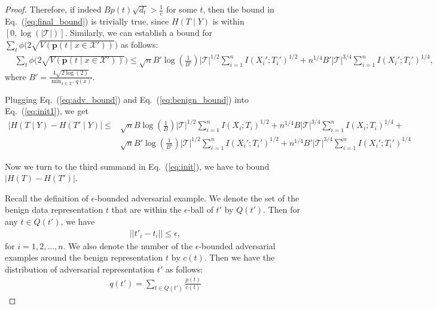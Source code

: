\documentclass{article} \usepackage{iclr2021_conference,times}
\theoremstyle{definition}
\theoremstyle{remark}
\begin{document}
\begin{proof}
Therefore, if indeed $Bp(t) \sqrt{d_t} > \frac{1}{e}$ for some $t$, then the bound in Eq.~(\ref{eq:final_bound}) is trivially true, since $H(T \mid Y)$ is within $[0, \log(|\mathcal{T}|)]$.
Similarly, we can establish a bound for $\sum_t \phi \big( 2\sqrt{V(\mathbf{p}(t \mid x \in \mathcal{X'}))} \big)$ as follows:
\begin{align} 
    \label{eq:adv_bound}
      &\sum_t \phi \big( 2\sqrt{V(\mathbf{p}(t \mid x \in \mathcal{X'}))} \big)
      \le \sqrt{n}B'\log(\frac{1}{B'}) |\mathcal{T}|^{1/2} \sum_{i=1}^n I(X_i'; T_i')^{1/2} + n^{1/4} B' |\mathcal{T}|^{3/4}\sum_{i=1}^n I(X_i'; T_i')^{1/4},
\end{align}
where $B' =\frac{4 \sqrt{2\log(2)}}{\min_{x \in \mathcal{X'}}q(x)}.$

Plugging Eq.~(\ref{eq:adv_bound}) and Eq.~(\ref{eq:benign_bound}) into Eq.~(\ref{eq:init1}), we get 
\begin{align}
    \label{eq:final_bound2}
    |H(T \mid Y) - H(T' \mid Y)| \le &\sqrt{n}B\log(\frac{1}{B}) |\mathcal{T}|^{1/2} \sum_{i=1}^n I(X_i; T_i)^{1/2} + n^{1/4} B  |\mathcal{T}|^{3/4}\sum_{i=1}^n I(X_i; T_i)^{1/4} + \nonumber \\ 
    &\sqrt{n}B'\log(\frac{1}{B'}) |\mathcal{T}|^{1/2} \sum_{i=1}^n I(X_i'; T_i')^{1/2} + n^{1/4} B' |\mathcal{T}|^{3/4}\sum_{i=1}^n I(X_i'; T_i')^{1/4} 
\end{align}

Now we turn to the third summand in Eq.~(\ref{eq:init}), we have to bound $|H(T) - H(T')|$.  


Recall the definition of $\epsilon$-bounded adversarial example. We denote the set of the benign data representation $t$ that are within the $\epsilon$-ball of $t'$ by $Q(t')$. Then for any $t \in Q(t')$, we have 
\begin{align}
   ||t'_i - t_i|| \le \epsilon,
\end{align}
for $i=1,2,...,n$. We also denote the number of the $\epsilon$-bounded adversarial examples around the benign representation $t$ by $c(t)$. Then we have the distribution of adversarial representation $t'$ as follows:
\begin{align}
    q(t') = \sum_{t \in Q(t')} \frac{p(t)}{c(t)}
\end{align}



\end{proof}
\end{document}
